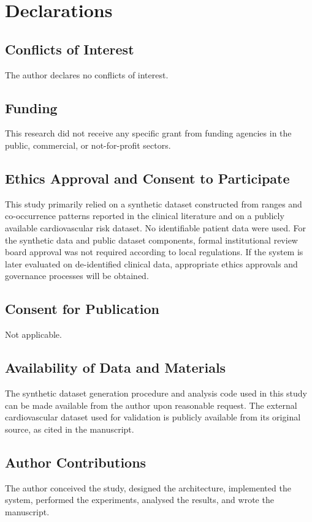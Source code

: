 \documentclass[12pt]{article}
\begin{document}
\section*{Declarations}

\subsection*{Conflicts of Interest}

The author declares no conflicts of interest.

\subsection*{Funding}

This research did not receive any specific grant from funding agencies in the public, commercial, or not-for-profit sectors.

\subsection*{Ethics Approval and Consent to Participate}

This study primarily relied on a synthetic dataset constructed from ranges and co-occurrence patterns reported in the clinical literature and on a publicly available cardiovascular risk dataset. No identifiable patient data were used. For the synthetic data and public dataset components, formal institutional review board approval was not required according to local regulations. If the system is later evaluated on de-identified clinical data, appropriate ethics approvals and governance processes will be obtained.

\subsection*{Consent for Publication}

Not applicable.

\subsection*{Availability of Data and Materials}

The synthetic dataset generation procedure and analysis code used in this study can be made available from the author upon reasonable request. The external cardiovascular dataset used for validation is publicly available from its original source, as cited in the manuscript.

\subsection*{Author Contributions}

The author conceived the study, designed the architecture, implemented the system, performed the experiments, analysed the results, and wrote the manuscript.
\end{document}
